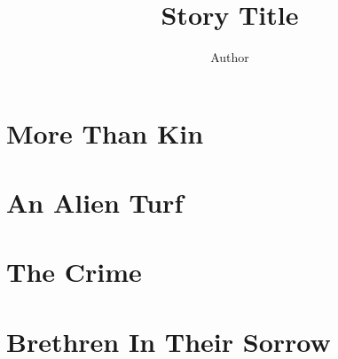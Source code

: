 \documentclass[ebook,11pt,oneside,openany]{memoir}
\begin{document}
\title{Story Title}
\author{Author}
\date{}
\maketitle

\section*{}

\clearforchapter

\cleartorecto
\part{More Than Kin}

\clearforchapter

\cleartorecto
\part{An Alien Turf}

\clearforchapter

\cleartorecto
\part{The Crime}

\clearforchapter

\cleartorecto
\part{Brethren In Their Sorrow}

\clearforchapter
\end{document}
